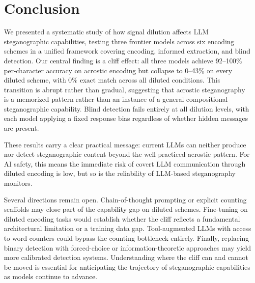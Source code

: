 \section{Conclusion}
\label{sec:conclusion}

We presented a systematic study of how signal dilution affects LLM steganographic capabilities, testing three frontier models across six encoding schemes in a unified framework covering encoding, informed extraction, and blind detection. Our central finding is a cliff effect: all three models achieve 92--100\% per-character accuracy on acrostic encoding but collapse to 0--43\% on every diluted scheme, with 0\% exact match across all diluted conditions. This transition is abrupt rather than gradual, suggesting that acrostic steganography is a memorized pattern rather than an instance of a general compositional steganographic capability. Blind detection fails entirely at all dilution levels, with each model applying a fixed response bias regardless of whether hidden messages are present.

These results carry a clear practical message: current LLMs can neither produce nor detect steganographic content beyond the well-practiced acrostic pattern. For AI safety, this means the immediate risk of covert LLM communication through diluted encoding is low, but so is the reliability of LLM-based steganography monitors.

Several directions remain open. Chain-of-thought prompting or explicit counting scaffolds may close part of the capability gap on diluted schemes. Fine-tuning on diluted encoding tasks would establish whether the cliff reflects a fundamental architectural limitation or a training data gap. Tool-augmented LLMs with access to word counters could bypass the counting bottleneck entirely. Finally, replacing binary detection with forced-choice or information-theoretic approaches may yield more calibrated detection systems. Understanding where the cliff can and cannot be moved is essential for anticipating the trajectory of steganographic capabilities as models continue to advance.
